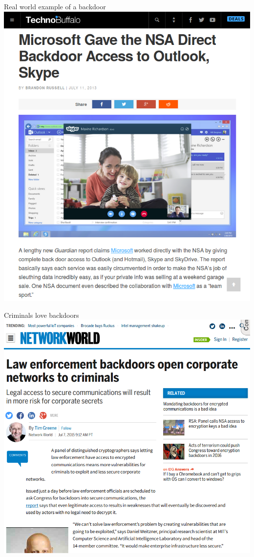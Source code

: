 \documentclass[11pt]{beamer}
\begin{document}
\begin{frame}{Real world example of a backdoor}
\includegraphics[scale=0.27]{skype.png}
\end{frame}

\begin{frame}{Criminals love backdoors}
\includegraphics[scale=0.28]{backdoor_criminals.png}
\end{frame}
\end{document}
